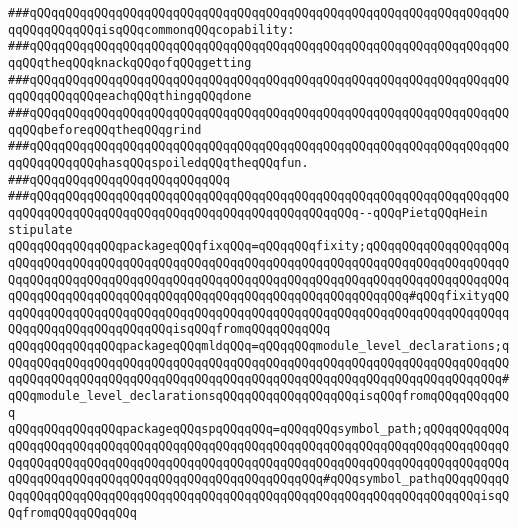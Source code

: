 \verb|###qQQqqQQqqQQqqQQqqQQqqQQqqQQqqQQqqQQqqQQqqQQqqQQqqQQqqQQqqQQqqQQqqQQqqQQqqQQqqQQqisqQQqcommonqQQqcopability:|\newline
\verb|###qQQqqQQqqQQqqQQqqQQqqQQqqQQqqQQqqQQqqQQqqQQqqQQqqQQqqQQqqQQqqQQqqQQqqQQqtheqQQqknackqQQqofqQQqgetting|\newline
\verb|###qQQqqQQqqQQqqQQqqQQqqQQqqQQqqQQqqQQqqQQqqQQqqQQqqQQqqQQqqQQqqQQqqQQqqQQqqQQqqQQqeachqQQqthingqQQqdone|\newline
\verb|###qQQqqQQqqQQqqQQqqQQqqQQqqQQqqQQqqQQqqQQqqQQqqQQqqQQqqQQqqQQqqQQqqQQqqQQqbeforeqQQqtheqQQqgrind|\newline
\verb|###qQQqqQQqqQQqqQQqqQQqqQQqqQQqqQQqqQQqqQQqqQQqqQQqqQQqqQQqqQQqqQQqqQQqqQQqqQQqqQQqhasqQQqspoiledqQQqtheqQQqfun.|\newline
\verb|###qQQqqQQqqQQqqQQqqQQqqQQqqQQq|\newline
\verb|###qQQqqQQqqQQqqQQqqQQqqQQqqQQqqQQqqQQqqQQqqQQqqQQqqQQqqQQqqQQqqQQqqQQqqQQqqQQqqQQqqQQqqQQqqQQqqQQqqQQqqQQqqQQqqQQqqQQq--qQQqPietqQQqHein|\newline
\newline
\newline
\newline
\verb|stipulate|\newline
\verb|qQQqqQQqqQQqqQQqpackageqQQqfixqQQq=qQQqqQQqfixity;qQQqqQQqqQQqqQQqqQQqqQQqqQQqqQQqqQQqqQQqqQQqqQQqqQQqqQQqqQQqqQQqqQQqqQQqqQQqqQQqqQQqqQQqqQQqqQQqqQQqqQQqqQQqqQQqqQQqqQQqqQQqqQQqqQQqqQQqqQQqqQQqqQQqqQQqqQQqqQQqqQQqqQQqqQQqqQQqqQQqqQQqqQQqqQQqqQQqqQQqqQQqqQQqqQQqqQQq#qQQqfixityqQQqqQQqqQQqqQQqqQQqqQQqqQQqqQQqqQQqqQQqqQQqqQQqqQQqqQQqqQQqqQQqqQQqqQQqqQQqqQQqqQQqqQQqqQQqqQQqisqQQqfromqQQqqQQqqQQq|\newline
\verb|qQQqqQQqqQQqqQQqpackageqQQqmldqQQq=qQQqqQQqmodule_level_declarations;qQQqqQQqqQQqqQQqqQQqqQQqqQQqqQQqqQQqqQQqqQQqqQQqqQQqqQQqqQQqqQQqqQQqqQQqqQQqqQQqqQQqqQQqqQQqqQQqqQQqqQQqqQQqqQQqqQQqqQQqqQQqqQQqqQQqqQQqqQQq#qQQqmodule_level_declarationsqQQqqQQqqQQqqQQqqQQqisqQQqfromqQQqqQQqqQQq|\newline
\verb|qQQqqQQqqQQqqQQqpackageqQQqspqQQqqQQq=qQQqqQQqsymbol_path;qQQqqQQqqQQqqQQqqQQqqQQqqQQqqQQqqQQqqQQqqQQqqQQqqQQqqQQqqQQqqQQqqQQqqQQqqQQqqQQqqQQqqQQqqQQqqQQqqQQqqQQqqQQqqQQqqQQqqQQqqQQqqQQqqQQqqQQqqQQqqQQqqQQqqQQqqQQqqQQqqQQqqQQqqQQqqQQqqQQqqQQqqQQqqQQqqQQq#qQQqsymbol_pathqQQqqQQqqQQqqQQqqQQqqQQqqQQqqQQqqQQqqQQqqQQqqQQqqQQqqQQqqQQqqQQqqQQqqQQqqQQqisqQQqfromqQQqqQQqqQQq|\newline
